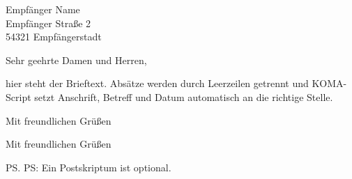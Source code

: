 \documentclass[11pt]{scrlttr2}
\begin{document}
\begin{letter}{%
    Empfänger Name\\
    Empfänger Straße 2\\
    54321 Empfängerstadt%
}

\opening{Sehr geehrte Damen und Herren,}

hier steht der Brieftext. Absätze werden durch Leerzeilen getrennt und
KOMA-Script setzt Anschrift, Betreff und Datum automatisch an die richtige
Stelle.

Mit freundlichen Grüßen

\closing{Mit freundlichen Grüßen}

\ps{PS: Ein Postskriptum ist optional.}

\end{letter}
\end{document}

